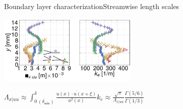 \documentclass[xcolor=table,aspectratio=169]{beamer}
\let\mathrm\mathsf
\begin{document}
\begin{frame}[b]{Boundary layer characterization}{Streamwise length scales}
    \begin{center}
    \includegraphics[width=0.5\textwidth]{./scripts/flow/time_resolved/Results/StreamwiseLengthScales_real_yloc.png}
    \end{center}
    \begin{center}
        \scriptsize{
            $\Lambda_{x|uu} \approx {\displaystyle \int_{0\,\left( \delta_\mathrm{min} \right)}^{\delta}\frac{\overline{u\left( x \right) \cdot u\left( x+\xi \right)}}{u^2\left( x \right)}}$\hspace{1cm}$k_e \approx {\displaystyle \frac{\sqrt{\pi}}{\Lambda_{x|uu}}\frac{\Gamma\left( 5/6 \right)}{\Gamma\left( 1/3 \right)}}$
        }
    \end{center}
    \vspace{0.5cm}
\end{frame}
\end{document}
